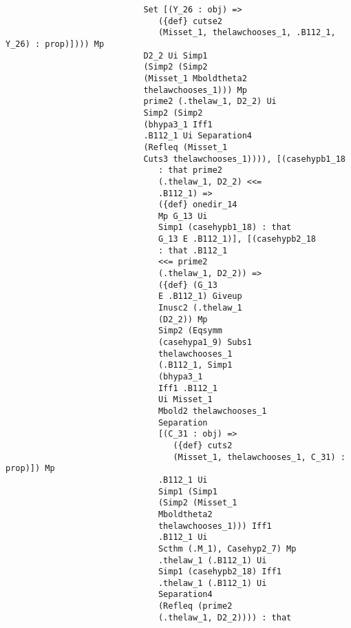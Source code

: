 \documentclass[12pt]{article}
\begin{document}
\begin{verbatim}
                            Set [(Y_26 : obj) => 
                               ({def} cutse2 
                               (Misset_1, thelawchooses_1, .B112_1, Y_26) : prop)]))) Mp 
                            D2_2 Ui Simp1 
                            (Simp2 (Simp2 
                            (Misset_1 Mboldtheta2 
                            thelawchooses_1))) Mp 
                            prime2 (.thelaw_1, D2_2) Ui 
                            Simp2 (Simp2 
                            (bhypa3_1 Iff1 
                            .B112_1 Ui Separation4 
                            (Refleq (Misset_1 
                            Cuts3 thelawchooses_1)))), [(casehypb1_18 
                               : that prime2 
                               (.thelaw_1, D2_2) <<= 
                               .B112_1) => 
                               ({def} onedir_14 
                               Mp G_13 Ui 
                               Simp1 (casehypb1_18) : that 
                               G_13 E .B112_1)], [(casehypb2_18 
                               : that .B112_1 
                               <<= prime2 
                               (.thelaw_1, D2_2)) => 
                               ({def} (G_13 
                               E .B112_1) Giveup 
                               Inusc2 (.thelaw_1 
                               (D2_2)) Mp 
                               Simp2 (Eqsymm 
                               (casehypa1_9) Subs1 
                               thelawchooses_1 
                               (.B112_1, Simp1 
                               (bhypa3_1 
                               Iff1 .B112_1 
                               Ui Misset_1 
                               Mbold2 thelawchooses_1 
                               Separation 
                               [(C_31 : obj) => 
                                  ({def} cuts2 
                                  (Misset_1, thelawchooses_1, C_31) : prop)]) Mp 
                               .B112_1 Ui 
                               Simp1 (Simp1 
                               (Simp2 (Misset_1 
                               Mboldtheta2 
                               thelawchooses_1))) Iff1 
                               .B112_1 Ui 
                               Scthm (.M_1), Casehyp2_7) Mp 
                               .thelaw_1 (.B112_1) Ui 
                               Simp1 (casehypb2_18) Iff1 
                               .thelaw_1 (.B112_1) Ui 
                               Separation4 
                               (Refleq (prime2 
                               (.thelaw_1, D2_2)))) : that 

\end{verbatim}
\end{document}
